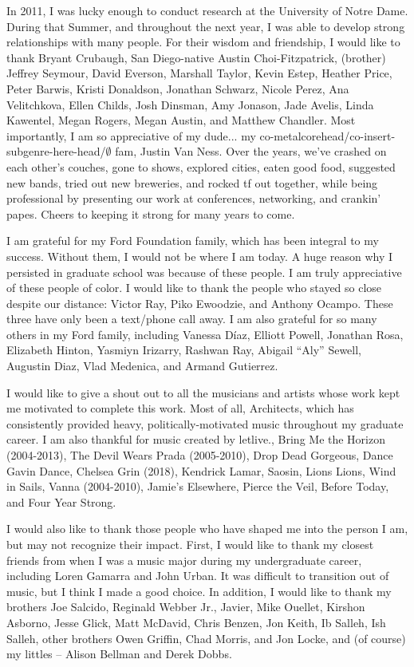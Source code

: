 {  In 2011, I was lucky enough to conduct research at the University of Notre Dame. During that Summer, and throughout the next year, I was able to develop strong relationships with many people. For their wisdom and friendship, I would like to thank Bryant Crubaugh, San Diego-native Austin Choi-Fitzpatrick, (brother) Jeffrey Seymour, David Everson, Marshall Taylor, Kevin Estep, Heather Price, Peter Barwis, Kristi Donaldson, Jonathan Schwarz, Nicole Perez, Ana Velitchkova, Ellen Childs, Josh Dinsman, Amy Jonason, Jade Avelis, Linda Kawentel, Megan Rogers, Megan Austin, and Matthew Chandler. Most importantly, I am so appreciative of my dude... my co-metalcorehead/co-insert-subgenre-here-head/$\emptyset$ fam, Justin Van Ness. Over the years, we've crashed on each other's couches, gone to shows, explored cities, eaten good food, suggested new bands, tried out new breweries, and rocked tf out together, while being professional by presenting our work at conferences, networking, and crankin' papes. Cheers to keeping it strong for many years to come.
  
I am grateful for my Ford Foundation family, which has been integral to my success. Without them, I would not be where I am today. A huge reason why I persisted in graduate school was because of these people. I am truly appreciative of these people of color. I would like to thank the people who stayed so close despite our distance: Victor Ray, Piko Ewoodzie, and Anthony Ocampo. These three have only been a text/phone call away. I am also grateful for so many others in my Ford family, including Vanessa D\'{i}az, Elliott Powell, Jonathan Rosa, Elizabeth Hinton, Yasmiyn Irizarry, Rashwan Ray, Abigail ``Aly'' Sewell, Augustin Diaz, Vlad Medenica, and Armand Gutierrez. 
  
 I would like to give a shout out to all the musicians and artists whose work kept me motivated to complete this work. Most of all, Architects, which has consistently provided heavy, politically-motivated music throughout my graduate career. I am also thankful for music created by letlive., Bring Me the Horizon (2004-2013), The Devil Wears Prada (2005-2010), Drop Dead Gorgeous, Dance Gavin Dance, Chelsea Grin (2018), Kendrick Lamar, Saosin, Lions Lions, Wind in Sails, Vanna (2004-2010), Jamie's Elsewhere, Pierce the Veil, Before Today, and Four Year Strong. 
  
   I would also like to thank those people who have shaped me into the person I am, but may not recognize their impact. First, I would like to thank my closest friends from when I was a music major during my undergraduate career, including Loren Gamarra and John Urban. It was difficult to transition out of music, but I think I made a good choice. In addition, I would like to thank my brothers Joe Salcido, Reginald Webber Jr., Javier, Mike Ouellet, Kirshon Asborno, Jesse Glick, Matt McDavid, Chris Benzen, Jon Keith, Ib Salleh, Ish Salleh, other brothers Owen Griffin, Chad Morris, and Jon Locke, and (of course) my littles -- Alison Bellman and Derek Dobbs. 
   
}

